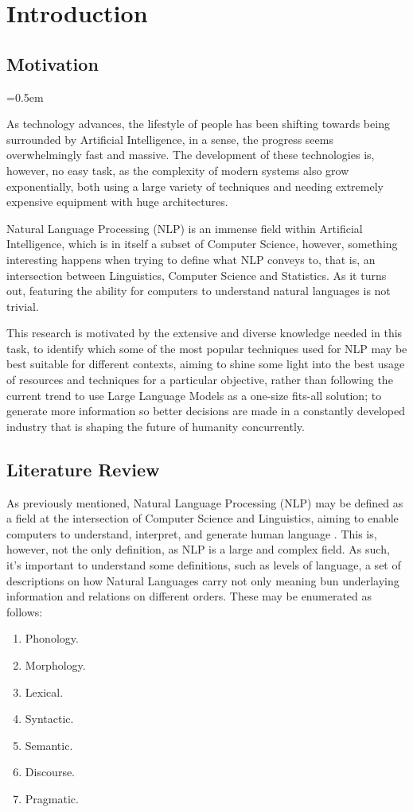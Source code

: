 \chapter{Introduction}
\label{chapter:chapter01}

\section{Motivation}
\parskip=0.5em

As technology advances, the lifestyle of people has been shifting towards being surrounded by Artificial Intelligence, in a sense, the progress seems overwhelmingly fast and massive. The development of these technologies is, however, no easy task, as the complexity of modern systems also grow exponentially, both using a large variety of techniques and needing extremely expensive equipment with huge architectures. 

Natural Language Processing (NLP) is an immense field within Artificial Intelligence, which is in itself a subset of Computer Science, however, something interesting happens when trying to define what NLP conveys to, that is, an intersection between Linguistics, Computer Science and Statistics. As it turns out, featuring the ability for computers to understand natural languages is not trivial.

This research is motivated by the extensive and diverse knowledge needed in this task, to identify which some of the most popular techniques used for NLP may be best suitable for different contexts, aiming to shine some light into the best usage of resources and techniques for a particular objective, rather than following the current trend to use Large Language Models as a one-size fits-all solution; to generate more information so better decisions are made in a constantly developed industry that is shaping the future of humanity concurrently.

\section{Literature Review}

As previously mentioned, Natural Language Processing (NLP) may be defined as a field at the intersection of Computer Science and Linguistics, aiming to enable computers to understand, interpret, and generate human language \cite{liddy2001}. This is, however, not the only definition, as NLP is a large and complex field. As such, it’s important to understand some definitions, such as levels of language, a set of descriptions on how Natural Languages carry not only meaning bun underlaying information and relations on different orders. These may be enumerated as follows:
\begin{enumerate}
    \item Phonology.
    \item Morphology.
    \item Lexical.
    \item Syntactic.
    \item Semantic.
    \item Discourse.
    \item Pragmatic.
\end{enumerate}


